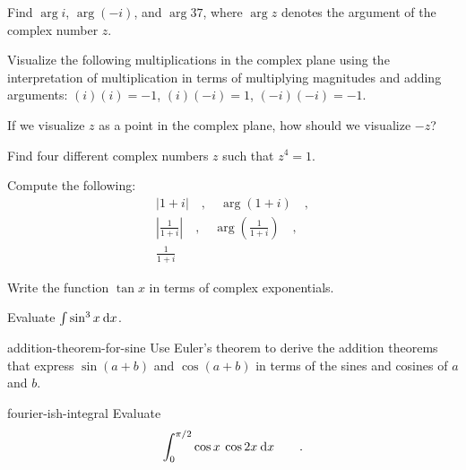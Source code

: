 \begin{hwsection}

\begin{hw}
Find $\arg i$, $\arg(-i)$, and $\arg 37$, where $\arg z$ denotes the argument of the complex number $z$.
\end{hw}

\begin{hw}
Visualize the following multiplications in the complex plane using the interpretation of multiplication
in terms of multiplying magnitudes and adding arguments: $(i)(i)=-1$, $(i)(-i)=1$, $(-i)(-i)=-1$.
\end{hw}

\begin{hw}
If we visualize $z$ as a point in the complex plane, how should we visualize $-z$?
\end{hw}

\begin{hw}
Find four different complex numbers $z$ such that $z^4=1$.
\end{hw}

\begin{hw}
Compute the following: 
\begin{gather*}
|1+i| \quad , \quad \arg(1+i) \quad , \\
  \left|\frac{1}{1+i}\right| \quad , \quad \arg\left(\frac{1}{1+i}\right) \quad , \\
  \frac{1}{1+i}
\end{gather*}
\end{hw}

\begin{hw}
Write the function $\tan x$ in terms of complex exponentials.
\end{hw}

\begin{hw}
Evaluate $\int \sin^3 x\: \textup{d} x$.
\end{hw}

\begin{hwwithsoln}{addition-theorem-for-sine}
Use Euler's theorem to derive the addition theorems that express
$\sin(a+b)$ and $\cos(a+b)$ in terms of the sines and cosines of
$a$ and $b$.
\end{hwwithsoln}

\begin{hwwithsoln}{fourier-ish-integral}
Evaluate
\begin{equation*}
  \int_0^{\pi/2} \cos x \: \cos 2x \: \textup{d} x \qquad .
\end{equation*}
\end{hwwithsoln}



\end{hwsection}
